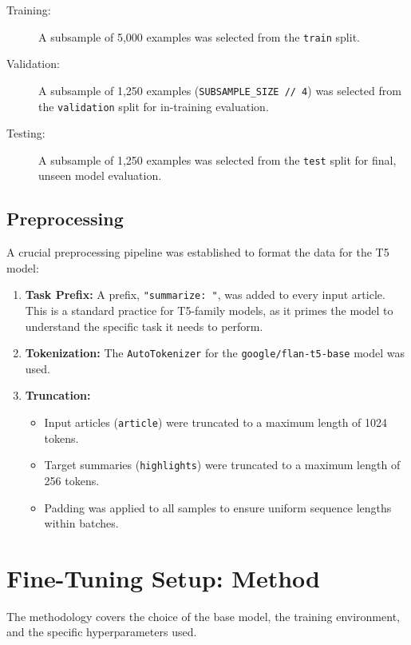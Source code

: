 \documentclass[12pt,a4paper]{article}
\begin{document}
\begin{description}
    \item[Training:] A subsample of 5,000 examples was selected from the \texttt{train} split.
    \item[Validation:] A subsample of 1,250 examples (\texttt{SUBSAMPLE\_SIZE // 4}) was selected from the \texttt{validation} split for in-training evaluation.
    \item[Testing:] A subsample of 1,250 examples was selected from the \texttt{test} split for final, unseen model evaluation.
\end{description}

\subsection{Preprocessing}
A crucial preprocessing pipeline was established to format the data for the T5 model:

\begin{enumerate}
    \item \textbf{Task Prefix:} A prefix, \texttt{"summarize: "}, was added to every input article. This is a standard practice for T5-family models, as it primes the model to understand the specific task it needs to perform.
    \item \textbf{Tokenization:} The \texttt{AutoTokenizer} for the \texttt{google/flan-t5-base} model was used.
    \item \textbf{Truncation:}
        \begin{itemize}
            \item Input articles (\texttt{article}) were truncated to a maximum length of 1024 tokens.
            \item Target summaries (\texttt{highlights}) were truncated to a maximum length of 256 tokens.
            \item Padding was applied to all samples to ensure uniform sequence lengths within batches.
        \end{itemize}
\end{enumerate}

\section{Fine-Tuning Setup: Method}

The methodology covers the choice of the base model, the training environment, and the specific hyperparameters used.
\end{document}
